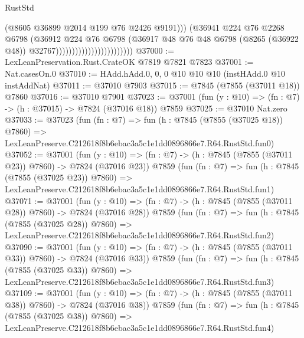 \begin{lexlean}{RustStd}
\begin{coremodule}
                                                  (@8605 @36899 @2014 @199 @76 @2426 @9191)))
                                              (@36941
                                                @224
                                                @76
                                                @2268
                                                @6798
                                                (@36912
                                                  @224
                                                  @76
                                                  @6798
                                                  (@36917
                                                    @48
                                                    @76
                                                    @48
                                                    @6798
                                                    (@8265 (@36922 @48))
                                                    @32767))))))))))))))))))))))))
@37000 := LexLeanPreservation.Rust.CrateOK @7819 @7821 @7823
@37001 := Nat.casesOn.{0}
@37010 := HAdd.hAdd.{0, 0, 0} @10 @10 @10 (instHAdd.{0} @10 instAddNat)
@37011 := @37010 @7903
@37015 := @7845 (@7855 (@37011 @18)) @7860
@37016 := @37010 @7901
@37023 := @37001 (fun (y : @10) => (fn : @7) -> (h : @37015) -> @7824 (@37016 @18)) @7859
@37025 := @37010 Nat.zero
@37033 := @37023
    (fun (fn : @7) =>
    fun (h : @7845 (@7855 (@37025 @18)) @7860) =>
    LexLeanPreserve.C212618f8b6ebac3a5c1e1dd0896866e7.R64.RustStd.fun0)
@37052 := @37001
    (fun (y : @10) => (fn : @7) -> (h : @7845 (@7855 (@37011 @23)) @7860) -> @7824 (@37016 @23))
    @7859
    (fun (fn : @7) =>
    fun (h : @7845 (@7855 (@37025 @23)) @7860) =>
    LexLeanPreserve.C212618f8b6ebac3a5c1e1dd0896866e7.R64.RustStd.fun1)
@37071 := @37001
    (fun (y : @10) => (fn : @7) -> (h : @7845 (@7855 (@37011 @28)) @7860) -> @7824 (@37016 @28))
    @7859
    (fun (fn : @7) =>
    fun (h : @7845 (@7855 (@37025 @28)) @7860) =>
    LexLeanPreserve.C212618f8b6ebac3a5c1e1dd0896866e7.R64.RustStd.fun2)
@37090 := @37001
    (fun (y : @10) => (fn : @7) -> (h : @7845 (@7855 (@37011 @33)) @7860) -> @7824 (@37016 @33))
    @7859
    (fun (fn : @7) =>
    fun (h : @7845 (@7855 (@37025 @33)) @7860) =>
    LexLeanPreserve.C212618f8b6ebac3a5c1e1dd0896866e7.R64.RustStd.fun3)
@37109 := @37001
    (fun (y : @10) => (fn : @7) -> (h : @7845 (@7855 (@37011 @38)) @7860) -> @7824 (@37016 @38))
    @7859
    (fun (fn : @7) =>
    fun (h : @7845 (@7855 (@37025 @38)) @7860) =>
    LexLeanPreserve.C212618f8b6ebac3a5c1e1dd0896866e7.R64.RustStd.fun4)

\end{coremodule}
\end{lexlean}
